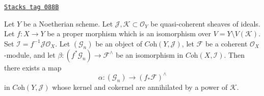 \begin{lemma}
\label{coherent-lemma-inverse-systems-push-pull}
\href{https://stacks.math.columbia.edu/tag/088B}{\texttt{Stacks tag 088B}}

Let $Y$ be a Noetherian scheme. Let
$\mathcal{J}, \mathcal{K} \subset \mathcal{O}_Y$
be quasi-coherent sheaves of ideals.
Let $f : X \to Y$ be a proper morphism which is an isomorphism
over $V = Y \setminus V(\mathcal{K})$.
Set $\mathcal{I} = f^{-1}\mathcal{J} \mathcal{O}_X$.
Let $(\mathcal{G}_n)$ be an object of $\textit{Coh}(Y, \mathcal{J})$,
let $\mathcal{F}$ be a coherent $\mathcal{O}_X$-module, and let
$\beta : (f^*\mathcal{G}_n)  \to \mathcal{F}^\wedge$ be an isomorphism in
$\textit{Coh}(X, \mathcal{I})$. Then there exists a map
$$
\alpha :
(\mathcal{G}_n)
\longrightarrow
(f_*\mathcal{F})^\wedge
$$
in $\textit{Coh}(Y, \mathcal{J})$ whose kernel and cokernel
are annihilated by a power of $\mathcal{K}$.
\end{lemma}

